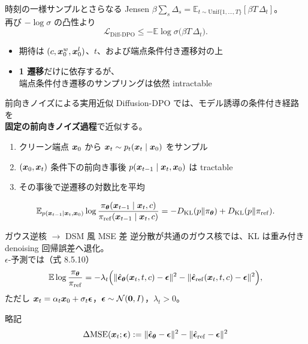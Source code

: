 \asmain
\begin{frame}{時刻の一様サンプルとさらなる Jensen}
    $\beta\sum_s\Delta_s=\mathbb{E}_{t\sim\mathrm{Unif}\{1,\ldots,T\}}[\beta T\,\Delta_t]$。\\
    再び $-\log\sigma$ の凸性より
    \[
        \mathcal{L}_{\mathrm{Diff\text{-}DPO}}
        \le
        -\mathbb{E}
        \log\sigma\!\bigl(\beta T\,\Delta_t\bigr).
    \]
    \begin{itemize}
        \item 期待は $(c,\bm{x}_0^w,\bm{x}_0^l)$、$t$、および端点条件付き遷移対の上
        \item \textbf{1 遷移}だけに依存するが、\\
        端点条件付き遷移のサンプリングは依然 intractable
    \end{itemize}
\end{frame}
\asmain
\begin{frame}{前向きノイズによる実用近似}
    Diffusion-DPO では、モデル誘導の条件付き経路を\\
    \textbf{固定の前向きノイズ過程}で近似する。
    \begin{enumerate}
        \item クリーン端点 $\bm{x}_0$ から $\bm{x}_t\sim p_t(\bm{x}_t\mid\bm{x}_0)$ をサンプル
        \item $(\bm{x}_0,\bm{x}_t)$ 条件下の前向き事後 $p(\bm{x}_{t-1}\mid\bm{x}_t,\bm{x}_0)$ は tractable
        \item その事後で逆遷移の対数比を平均
    \end{enumerate}
    \[
        \mathbb{E}_{p(\bm{x}_{t-1}\mid\bm{x}_t,\bm{x}_0)}
        \log\frac{\pi_{\bm{\theta}}(\bm{x}_{t-1}\mid\bm{x}_t,c)}{\pi_{\mathrm{ref}}(\bm{x}_{t-1}\mid\bm{x}_t,c)}
        =
        -D_{\mathrm{KL}}(p\|\pi_{\bm{\theta}})
        +D_{\mathrm{KL}}(p\|\pi_{\mathrm{ref}}).
    \]
\end{frame}
\asmain
\begin{frame}{ガウス逆核 $\to$ DSM 風 MSE 差}
    逆分散が共通のガウス核では、KL は重み付き denoising 回帰誤差へ退化。\\
    $\epsilon$-予測では（式 8.5.10）
    \[
        \mathbb{E}
        \log\frac{\pi_{\bm{\theta}}}{\pi_{\mathrm{ref}}}
        =
        -\lambda_t
        \Bigl(
        \|\hat{\bm{\epsilon}}_{\bm{\theta}}(\bm{x}_t,t,c)-\bm{\epsilon}\|^2
        -
        \|\hat{\bm{\epsilon}}_{\mathrm{ref}}(\bm{x}_t,t,c)-\bm{\epsilon}\|^2
        \Bigr),
    \]
    ただし $\bm{x}_t=\alpha_t\bm{x}_0+\sigma_t\bm{\epsilon}$，$\bm{\epsilon}\sim\mathcal{N}(\bm{0},I)$，$\lambda_t>0$。
    \begin{block}{略記}
        \[
            \Delta\mathrm{MSE}(\bm{x}_t;\bm{\epsilon})
            :=
            \|\hat{\bm{\epsilon}}_{\bm{\theta}}-\bm{\epsilon}\|^2
            -
            \|\hat{\bm{\epsilon}}_{\mathrm{ref}}-\bm{\epsilon}\|^2
        \]
    \end{block}
\end{frame}
